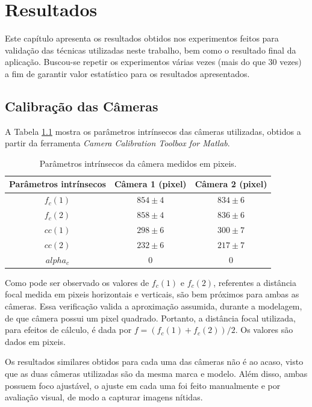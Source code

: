 \chapter{Resultados}

Este capítulo apresenta os resultados obtidos nos experimentos feitos para validação das técnicas utilizadas neste trabalho, bem como o resultado final da aplicação. Buscou-se repetir os experimentos várias vezes (mais do que 30 vezes) a fim de garantir valor estatístico para os resultados apresentados.

\section{Calibração das Câmeras}

A Tabela \ref{tab:params_intrisecos} mostra os parâmetros intrínsecos das câmeras utilizadas, obtidos a partir da ferramenta \textit{Camera Calibration Toolbox for Matlab}.

\begin{table}[!htb]
\centering
\begin{tabular}{|c|c|c|}
\hline
Parâmetros intrínsecos & Câmera 1 (pixel) & Câmera 2 (pixel)\\ \hline
$f_c(1)$ & $854 \pm 4$ &  $834 \pm 6$ \\ \hline
$f_c(2)$ & $858 \pm 4$ & $836 \pm 6$ \\ \hline
$cc(1)$ & $298 \pm 6$ & $300 \pm 7$ \\ \hline
$cc(2)$ & $232 \pm 6$ & $217 \pm 7$ \\ \hline
$alpha_c$ & 0 & 0 \\ \hline
\end{tabular}

\caption{Parâmetros intrínsecos da câmera medidos em pixeis.}
\label{tab:params_intrisecos}
\end{table}

Como pode ser observado os valores de $f_c(1)$ e $f_c(2)$, referentes a distância focal medida em pixeis horizontais e verticais, são bem próximos para ambas as câmeras. Essa verificação valida a aproximação assumida, durante a modelagem, de que câmera possui um pixel quadrado. Portanto, a distância focal utilizada, para efeitos de cálculo, é dada por $f = (f_c(1) + f_c(2))/2$. Os valores são dados em pixeis.

Os resultados similares obtidos para cada uma das câmeras não é ao acaso, visto que as duas câmeras utilizadas são da mesma marca e modelo. Além disso, ambas possuem foco ajustável, o ajuste em cada uma foi feito manualmente e por avaliação visual, de modo a capturar imagens nítidas.

